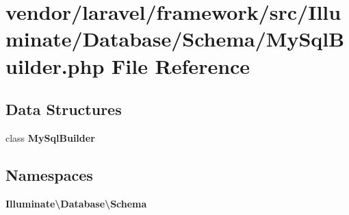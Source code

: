 \section{vendor/laravel/framework/src/\+Illuminate/\+Database/\+Schema/\+My\+Sql\+Builder.php File Reference}
\label{_my_sql_builder_8php}
\subsection*{Data Structures}
\begin{DoxyCompactItemize}
\item 
class {\bf My\+Sql\+Builder}
\end{DoxyCompactItemize}
\subsection*{Namespaces}
\begin{DoxyCompactItemize}
\item 
 {\bf Illuminate\textbackslash{}\+Database\textbackslash{}\+Schema}
\end{DoxyCompactItemize}
